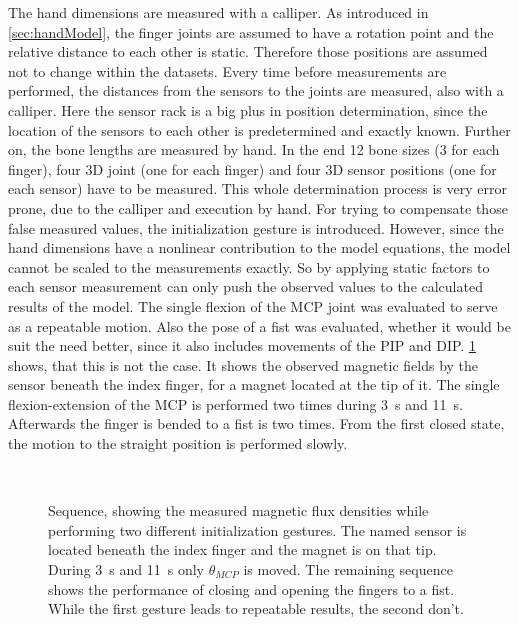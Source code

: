 The hand dimensions are measured with a calliper. As introduced in \ref{sec:handModel}, the finger joints are assumed to have a rotation point and the relative distance to each other is static. Therefore those positions are assumed not to change within the datasets. Every time before measurements are performed, the distances from the sensors to the joints are measured, also with a calliper. Here the sensor rack is a big plus in position determination, since the location of the sensors to each other is predetermined and exactly known. Further on, the bone lengths are measured by hand. In the end 12 bone sizes (3 for each finger), four 3D joint (one for each finger) and four 3D sensor positions (one for each sensor) have to be measured. This whole determination process is very error prone, due to the calliper and execution by hand. For trying to compensate those false measured values, the initialization gesture is introduced. However, since the hand dimensions have a nonlinear contribution to the model equations, the model cannot be scaled to the measurements exactly. So by applying static factors to each sensor measurement can only push the observed values to the calculated results of the model. The single flexion of the \ac{MCP} joint was evaluated to serve as a repeatable motion. Also the pose of a fist was evaluated, whether it would be suit the need better, since it also includes movements of the \ac{PIP} and \ac{DIP}. \ref{fig:set1mag} shows, that this is not the case. It shows the observed magnetic fields by the sensor beneath the index finger, for a magnet located at the tip of it. The single flexion-extension of the \ac{MCP} is performed two times during \SI{3}{\second} and \SI{11}{\second}. Afterwards the finger is bended to a fist is two times. From the first closed state, the motion to the straight position is performed slowly. 
\begin{figure}[!htb]
\centering
{}\\
\caption[Measured magnetic flux densities for various initialization gestures]
{Sequence, showing the measured magnetic flux densities while performing two different initialization gestures. The named sensor is located beneath the index finger and the magnet is on that tip. During \SI{3}{\second} and \SI{11}{\second} only $ \theta_{MCP} $ is moved. The remaining sequence shows the performance of closing and opening the fingers to a fist. While the first gesture leads to repeatable results, the second don't.}
\label{fig:set1mag}
\end{figure}
